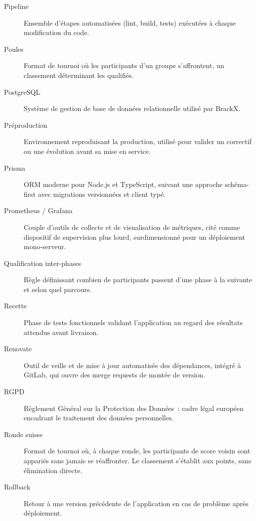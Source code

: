 \begin{description}
    \item[Pipeline] Ensemble d'étapes automatisées (lint, build, tests) exécutées à chaque modification du code.

    \item[Poules] Format de tournoi où les participants d'un groupe s'affrontent, un classement déterminant les qualifiés.

    \item[PostgreSQL] Système de gestion de base de données relationnelle utilisé par BrackX.

    \item[Préproduction] Environnement reproduisant la production, utilisé pour valider un correctif ou une évolution avant sa mise en service.

    \item[Prisma] ORM moderne pour Node.js et TypeScript, suivant une approche schéma-first avec migrations versionnées et client typé.

    \item[Prometheus / Grafana] Couple d'outils de collecte et de visualisation de métriques, cité comme dispositif de supervision plus lourd, surdimensionné pour un déploiement mono-serveur.

    \item[Qualification inter-phases] Règle définissant combien de participants passent d'une phase à la suivante et selon quel parcours.

    \item[Recette] Phase de tests fonctionnels validant l'application au regard des résultats attendus avant livraison.

    \item[Renovate] Outil de veille et de mise à jour automatisée des dépendances, intégré à GitLab, qui ouvre des merge requests de montée de version.

    \item[RGPD] Règlement Général sur la Protection des Données~: cadre légal européen encadrant le traitement des données personnelles.

    \item[Ronde suisse] Format de tournoi où, à chaque ronde, les participants de score voisin sont appariés sans jamais se réaffronter. Le classement s'établit aux points, sans élimination directe.

    \item[Rollback] Retour à une version précédente de l'application en cas de problème après déploiement.


\end{description}
